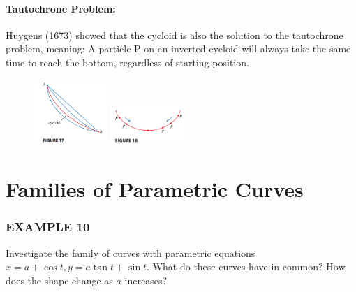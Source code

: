 \documentclass{article}
\begin{document}
\paragraph{Tautochrone Problem:} Huygens (1673) showed that the cycloid is also the solution to the tautochrone problem, meaning: A particle P on an inverted cycloid will always take the same time to reach the bottom, regardless of starting position.
\begin{figure}[htbp]
    \centering
    \includegraphics[width=0.25\textwidth]{graph15.png}
    \includegraphics[width=0.25\textwidth]{graph16.png}
\end{figure}


\section*{Families of Parametric Curves}
\subsubsection*{EXAMPLE 10}
Investigate the family of curves with parametric equations $x=a+\cos t, y=a\tan t+\sin t$. What do these curves have in common? How does the shape change as $a$ increases?
\end{document}
